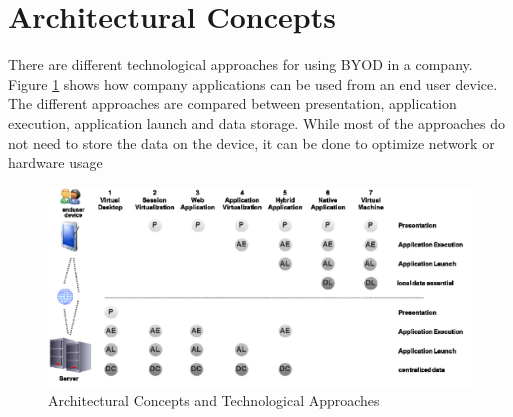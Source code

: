 \section{Architectural Concepts}
There are different technological approaches for using BYOD in a company. Figure \ref{fig:architectural_concepts} shows how company applications can be used from an end user device. The different approaches are compared between presentation, application execution, application launch and data storage. While most of the approaches do not need to store the data on the device, it can be done to optimize network or hardware usage \parencite{Disterer.2013}
\begin{figure}[H]
	\label{fig:architectural_concepts}
	\includegraphics[width=1\linewidth]{images/architectural_concepts}
	\caption{Architectural Concepts and Technological Approaches \parencite{Disterer.2013}}
\end{figure}
